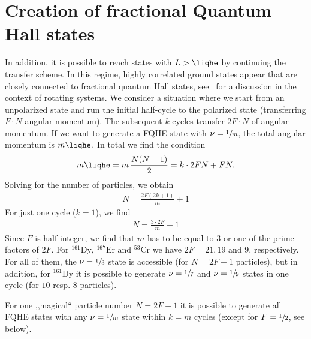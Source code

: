 \section{Creation of fractional Quantum Hall states}
In addition, it is possible to reach states with $L>\liqhe$ by continuing the transfer scheme.
In this regime,
highly correlated ground states appear that are closely connected to fractional quantum Hall states, see~\cite{Osterloh2007} for a discussion in the context of rotating systems.
We consider a situation where we start from an unpolarized state and run the initial half-cycle to the polarized state (transferring $F\cdot N$ angular momentum). The subsequent $k$ cycles transfer $2F \cdot N$ of angular momentum. If we want to generate a FQHE state with $\nu=\sfrac{1}{m}$, the total angular momentum is $m\liqhe$. In total we find the condition
\begin{align*}
m\liqhe=m\,\frac{N(N-1)}{2} = k\cdot 2F N + F N.
\end{align*}
Solving for the number of particles, we obtain
\begin{align*}
N=\frac{2F(2k+1)}{m} + 1
\end{align*}
For just one cycle ($k=1$), we find
\begin{align*}
N=\frac{3\cdot 2F}{m}+1
\end{align*}
Since $F$ is half-integer, we find that $m$ has to be equal to $3$ or one of the prime factors of $2F$.
For  $^{161}\text{Dy}$, $^{167}\text{Er}$ and $^{53}\text{Cr}$ we have $2F=21, 19$ and $9$, respectively. For all of them, the $\nu = \sfrac{1}{3}$ state is accessible (for $N=2F+1$ particles), but in addition, for $^{161}\text{Dy}$ it is possible to generate $\nu=\sfrac{1}{7}$ and $\nu=\sfrac{1}{9}$ states in one cycle (for $10$ resp. $8$ particles).

For one ,,magical`` particle number $N=2F+1$ it is possible to generate all FQHE states with any $\nu=\sfrac{1}{m}$ state within $k=m$ cycles (except for $F=\sfrac{1}{2}$, see below).


